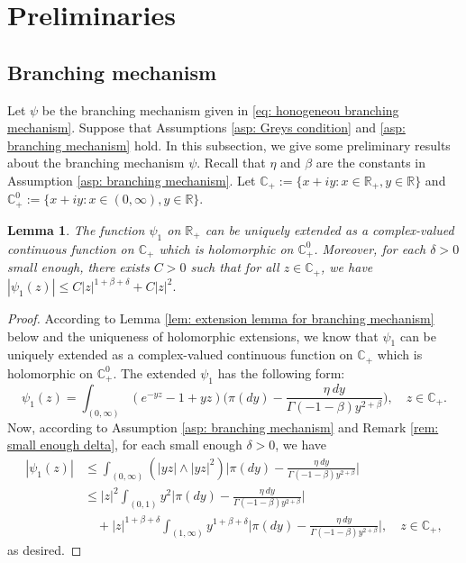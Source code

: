 \documentclass[12pt,a4paper]{amsart}
\theoremstyle{plain}
\newtheorem{lem}[thm]{Lemma}
\theoremstyle{definition}
\numberwithin{equation}{section}
\begin{document}
\section{Preliminaries}
\subsection{Branching mechanism}
\label{sec: branching mechanism}
	Let $\psi$ be the branching mechanism given in \eqref{eq: honogeneou branching mechanism}.
	Suppose that Assumptions \ref{asp: Greys condition} and \ref{asp: branching mechanism} hold.
	In this subsection, we give some preliminary results about the branching mechanism $\psi$.
	Recall that $\eta$ and $\beta$ are the constants in Assumption \ref{asp: branching mechanism}.
	Let $\mathbb C_+:= \{x+iy: x\in \mathbb R_+, y \in \mathbb R\}$ and $\mathbb C^0_+:= \{x+iy: x\in (0,\infty), y \in \mathbb R\}$.
\begin{lem}
\label{lem: complex extension for psi1}
	The function $\psi_1$ on $\mathbb R_+$ can be uniquely extended as a complex-valued continuous function on $\mathbb C_+$ which is holomorphic on $\mathbb C^0_+$.
		Moreover, for each $\delta > 0$ small enough, there exists $C>0$ such that for all $z\in \mathbb C_+$, we have
$
	|\psi_1(z)| \leq C |z|^{1+\beta+\delta} + C|z|^2.
$
\end{lem}
\begin{proof}
According to Lemma \ref{lem: extension lemma for branching mechanism} below and
the uniqueness of holomorphic extensions,
	we know that $\psi_1$ can be uniquely extended as a complex-valued continuous function on $\mathbb C_+$ which is holomorphic on $\mathbb C^0_+$.
	The extended $\psi_1$ has the following form:
\[
	\psi_1(z)= \int_{(0,\infty)}(e^{-yz}-1+yz) \Big(\pi(dy) - \frac{\eta~dy}{\Gamma(-1-\beta)y^{2+\beta}}\Big),
	\quad z\in \mathbb C_+.
\]
	Now, according to  Assumption \ref{asp: branching mechanism} and Remark \ref{rem: small enough delta}, for each small enough $\delta > 0$, we have
\begin{align}
	|\psi_1(z)|
	&\leq \int_{(0,\infty)} (|yz|\wedge |yz|^2) \Big|\pi(dy) - \frac{\eta~dy}{\Gamma(-1-\beta)y^{2+\beta}}\Big|
	\\&\leq  |z|^2\int_{(0,1)} y^2 \Big|\pi(dy) - \frac{\eta~dy}{\Gamma(-1-\beta)y^{2+\beta}}\Big|
	\\&\quad + |z|^{1+\beta +\delta}\int_{(1,\infty)} y^{1+\beta + \delta} \Big|\pi(dy) - \frac{\eta~dy}{\Gamma(-1-\beta)y^{2+\beta}}\Big|,
    \quad z \in \mathbb C_+,
\end{align}
	as desired.
\end{proof}
\end{document}
